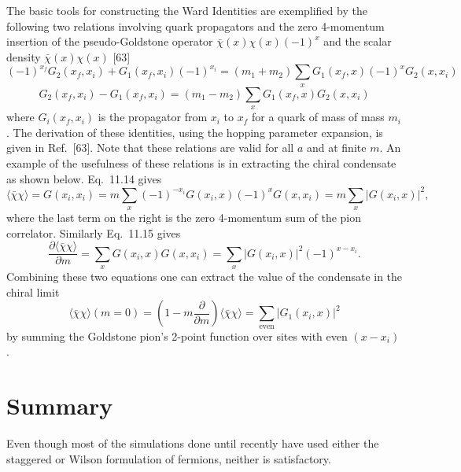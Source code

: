 The basic tools for constructing the Ward Identities are exemplified by
the following two relations involving quark propagators and the zero 4-momentum insertion of the pseudo-Goldstone operator $\bar{\chi}(x)\chi(x)(-1)^x$ and
the scalar density $\bar{\chi}(x)\chi(x)$ [63]
\begin{equation}
(-1)^{x_f}G_2(x_f,x_i) + G_1(x_f,x_i)(-1)^{x_i}
= (m_1+m_2)\sum_x G_1(x_f,x)(-1)^x G_2(x,x_i)
\label{eq:sf-wi-1}
\end{equation}
\begin{equation}
G_2(x_f,x_i) - G_1(x_f,x_i)
= (m_1-m_2)\sum_x G_1(x_f,x)G_2(x,x_i)
\label{eq:sf-wi-2}
\end{equation}
where $G_i(x_f,x_i)$ is the propagator from $x_i$ to $x_f$ for a quark of mass of
mass $m_i$. The derivation of these identities, using the hopping parameter
expansion, is given in Ref.~[63]. Note that these relations are valid for all
$a$ and at finite $m$. An example of the usefulness of these relations is in
extracting the chiral condensate as shown below. Eq.~11.14 gives
\begin{equation}
\langle\bar{\chi}\chi\rangle = G(x_i,x_i)
= m\sum_x (-1)^{-x_i}G(x_i,x)(-1)^x G(x,x_i)
= m\sum_x |G(x_i,x)|^2 ,
\label{eq:sf-condensate}
\end{equation}
where the last term on the right is the zero 4-momentum sum of the pion
correlator. Similarly Eq.~11.15 gives
\begin{equation}
\frac{\partial\langle\bar{\chi}\chi\rangle}{\partial m}
= \sum_x G(x_i,x)G(x,x_i)
= \sum_x |G(x_i,x)|^2(-1)^{x-x_i} .
\label{eq:sf-condensate-deriv}
\end{equation}
Combining these two equations one can extract the value of the condensate
in the chiral limit
\begin{equation}
\langle\bar{\chi}\chi\rangle(m=0)
= \left(1 - m\frac{\partial}{\partial m}\right)\langle\bar{\chi}\chi\rangle
= \sum_{\mathrm{even}} |G_1(x_i,x)|^2
\label{eq:sf-condensate-chiral}
\end{equation}
by summing the Goldstone pion's 2-point function over sites with even
$(x-x_i)$.

\section{Summary}

Even though most of the simulations done until recently have used either
the staggered or Wilson formulation of fermions, neither is satisfactory.
